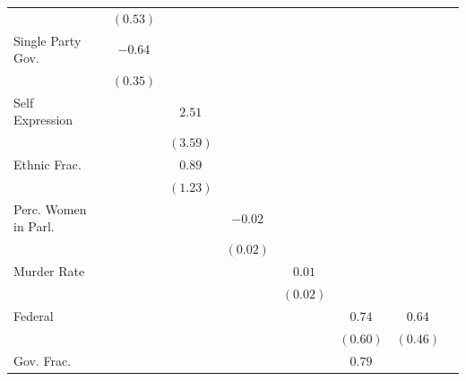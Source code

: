 \documentclass[a4paper]{article}\usepackage[]{graphicx}\usepackage[]{color}
\begin{document}
\begin{table}
\begin{center}
{\begin{tabular}{l c c c c c c c c }
                        &               & $(0.53)$      &              &             &             &              &              &              \\
Single Party Gov.       &               & $-0.64$       &              &             &             &              &              &              \\
                        &               & $(0.35)$      &              &             &             &              &              &              \\
Self Expression         &               &               & $2.51$       &             &             &              &              &              \\
                        &               &               & $(3.59)$     &             &             &              &              &              \\
Ethnic Frac.            &               &               & $0.89$       &             &             &              &              &              \\
                        &               &               & $(1.23)$     &             &             &              &              &              \\
Perc. Women in Parl.    &               &               &              & $-0.02$     &             &              &              &              \\
                        &               &               &              & $(0.02)$    &             &              &              &              \\
Murder Rate             &               &               &              &             & $0.01$      &              &              &              \\
                        &               &               &              &             & $(0.02)$    &              &              &              \\
Federal                 &               &               &              &             &             & $0.74$       & $0.64$       &              \\
                        &               &               &              &             &             & $(0.60)$     & $(0.46)$     &              \\
Gov. Frac.              &               &               &              &             &             & $0.79$       &              &              \\

\end{tabular}}
\end{center}
\end{table}
\end{document}
